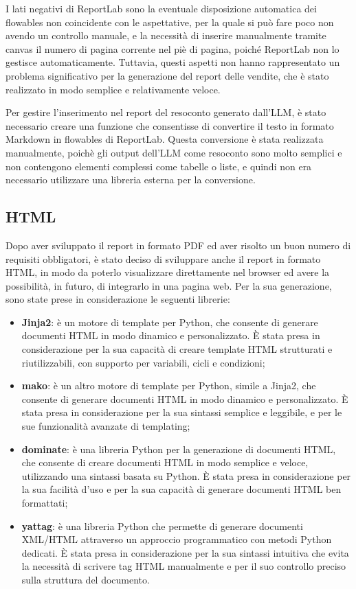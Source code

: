 I lati negativi di ReportLab sono la eventuale disposizione automatica dei flowables non coincidente con le aspettative, per la quale si può fare poco non avendo un controllo manuale, e la necessità di inserire manualmente tramite \gls{canvas} il numero di pagina corrente nel piè di pagina, poiché ReportLab non lo gestisce automaticamente. Tuttavia, questi aspetti non hanno rappresentato un problema significativo per la generazione del report delle vendite, che è stato realizzato in modo semplice e relativamente veloce.

Per gestire l'inserimento nel report del resoconto generato dall'LLM, è stato necessario creare una funzione che consentisse di convertire il testo in formato Markdown in flowables di ReportLab. Questa conversione è stata realizzata manualmente, poichè gli output dell'LLM come resoconto sono molto semplici e non contengono elementi complessi come tabelle o liste, e quindi non era necessario utilizzare una libreria esterna per la conversione.


\subsection{HTML}

Dopo aver sviluppato il report in formato PDF ed aver risolto un buon numero di requisiti obbligatori, è stato deciso di sviluppare anche il report in formato HTML, in modo da poterlo visualizzare direttamente nel browser ed avere la possibilità, in futuro, di integrarlo in una pagina web. Per la sua generazione, sono state prese in considerazione le seguenti librerie:
\begin{itemize}
    \item \textbf{Jinja2}: è un motore di template per Python, che consente di generare documenti HTML in modo dinamico e personalizzato. È stata presa in considerazione per la sua capacità di creare template HTML strutturati e riutilizzabili, con supporto per variabili, cicli e condizioni;
    \item \textbf{\gls{mako}}: è un altro motore di template per Python, simile a Jinja2, che consente di generare documenti HTML in modo dinamico e personalizzato. È stata presa in considerazione per la sua sintassi semplice e leggibile, e per le sue funzionalità avanzate di templating;
    \item \textbf{\gls{dominate}}: è una libreria Python per la generazione di documenti HTML, che consente di creare documenti HTML in modo semplice e veloce, utilizzando una sintassi basata su Python. È stata presa in considerazione per la sua facilità d'uso e per la sua capacità di generare documenti HTML ben formattati;
    \item \textbf{\gls{yattag}}: è una libreria Python che permette di generare documenti XML/HTML attraverso un approccio programmatico con metodi Python dedicati. È stata presa in considerazione per la sua sintassi intuitiva che evita la necessità di scrivere tag HTML manualmente e per il suo controllo preciso sulla struttura del documento.
\end{itemize}

